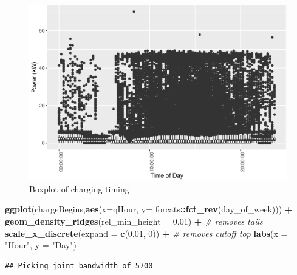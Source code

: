 \documentclass[]{article}
\newenvironment{Shaded}{\begin{snugshade}}{\end{snugshade}}
\newcommand{\KeywordTok}[1]{\textcolor[rgb]{0.13,0.29,0.53}{\textbf{#1}}}
\newcommand{\DataTypeTok}[1]{\textcolor[rgb]{0.13,0.29,0.53}{#1}}
\newcommand{\DecValTok}[1]{\textcolor[rgb]{0.00,0.00,0.81}{#1}}
\newcommand{\FloatTok}[1]{\textcolor[rgb]{0.00,0.00,0.81}{#1}}
\newcommand{\StringTok}[1]{\textcolor[rgb]{0.31,0.60,0.02}{#1}}
\newcommand{\CommentTok}[1]{\textcolor[rgb]{0.56,0.35,0.01}{\textit{#1}}}
\newcommand{\OperatorTok}[1]{\textcolor[rgb]{0.81,0.36,0.00}{\textbf{#1}}}
\newcommand{\NormalTok}[1]{#1}
\begin{document}
\begin{figure}
\centering
\includegraphics{EVBB_SummaryReport_files/figure-latex/plot2-1.pdf}
\caption{\label{fig:plot2}Boxplot of charging timing}
\end{figure}

\begin{Shaded}
\begin{Highlighting}[]
\KeywordTok{ggplot}\NormalTok{(chargeBegins,}\KeywordTok{aes}\NormalTok{(}\DataTypeTok{x=}\NormalTok{qHour, }\DataTypeTok{y=}\NormalTok{ forcats}\OperatorTok{::}\KeywordTok{fct_rev}\NormalTok{(day_of_week))) }\OperatorTok{+}
\StringTok{  }\KeywordTok{geom_density_ridges}\NormalTok{(}\DataTypeTok{rel_min_height =} \FloatTok{0.01}\NormalTok{) }\OperatorTok{+}\StringTok{        }\CommentTok{# removes tails}
\StringTok{  }\KeywordTok{scale_x_discrete}\NormalTok{(}\DataTypeTok{expand =} \KeywordTok{c}\NormalTok{(}\FloatTok{0.01}\NormalTok{, }\DecValTok{0}\NormalTok{)) }\OperatorTok{+}\StringTok{  }\CommentTok{# removes cutoff top}
\StringTok{  }\KeywordTok{labs}\NormalTok{(}\DataTypeTok{x =} \StringTok{"Hour"}\NormalTok{, }\DataTypeTok{y =} \StringTok{"Day"}\NormalTok{) }
\end{Highlighting}
\end{Shaded}

\begin{verbatim}
## Picking joint bandwidth of 5700
\end{verbatim}
\end{document}

